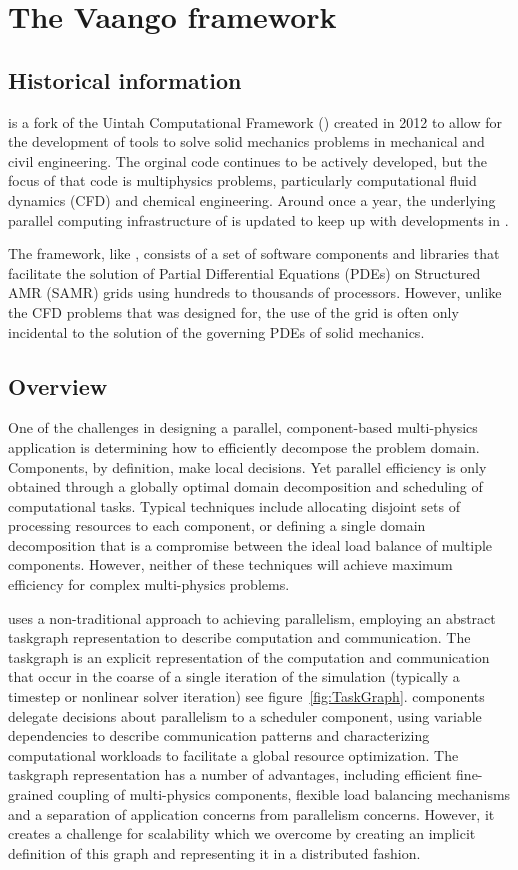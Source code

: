 \chapter{The Vaango framework}

\section{Historical information}
\Vaango is a fork of the Uintah Computational Framework (\Uintah) created
in 2012 to allow for the development of tools to solve solid mechanics problems
in mechanical and civil engineering.
The orginal \Uintah code continues to be actively developed, but the focus
of that code is multiphysics problems, particularly computational fluid
dynamics (CFD) and chemical engineering.  Around once a year, the underlying 
parallel computing infrastructure of \Vaango is updated to keep up with 
developments in \Uintah.

The \Vaango framework, like \Uintah, consists of a
set of software components and libraries that facilitate the solution
of Partial Differential Equations (PDEs) on Structured AMR (SAMR)
grids using hundreds to thousands of processors.  However, unlike the
CFD problems that \Uintah was designed for, the use of the grid is
often only incidental to the solution of the governing PDEs of solid
mechanics.

\section{Overview}
One of the challenges in designing a parallel, component-based
multi-physics application is determining how to efficiently decompose
the problem domain. Components, by definition, make local
decisions. Yet parallel efficiency is only obtained through a globally
optimal domain decomposition and scheduling of computational
tasks. Typical techniques include allocating disjoint sets of
processing resources to each component, or defining a single domain
decomposition that is a compromise between the ideal load balance of
multiple components. However, neither of these techniques will achieve
maximum efficiency for complex multi-physics problems.

\Vaango uses a non-traditional approach to achieving parallelism,
employing an abstract taskgraph representation to describe computation
and communication. The taskgraph is an explicit representation of the
computation and communication that occur in the coarse of a single
iteration of the simulation (typically a timestep or nonlinear solver
iteration) see figure~\ref{fig:TaskGraph}. \Vaango components delegate
decisions about parallelism to a scheduler component, using variable
dependencies to describe communication patterns and characterizing
computational workloads to facilitate a global resource
optimization. The taskgraph representation has a number of advantages,
including efficient fine-grained coupling of multi-physics components,
flexible load balancing mechanisms and a separation of application
concerns from parallelism concerns. However, it creates a challenge
for scalability which we overcome by creating an implicit definition
of this graph and representing it in a distributed fashion.

